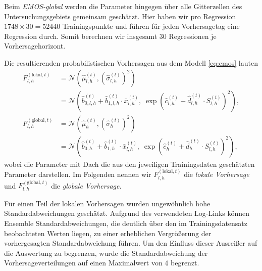 Beim \emph{EMOS-global} werden die Parameter hingegen über alle Gitterzellen des Untersuchungsgebiets gemeinsam geschätzt. Hier haben wir pro Regression $1748 \times 30 = 52440$ Trainingspunkte und führen für jeden Vorhersagetag eine Regression durch. Somit berechnen wir insgesamt $30$ Regressionen je Vorhersagehorizont.

Die resultierenden probabilistischen Vorhersagen aus dem Modell \eqref{eq:emos} lauten
\begin{equation*}
\begin{split}
F_{l,h}^{(\mathrm{lokal},t)}
&=\mathcal{N}\!\left(\hat{\mu}_{l,h}^{(t)},(\hat{\sigma}_{l,h}^{(t)})^2\right)\\
&=\mathcal{N}\!\left(\hat{b}_{0,l,h}^{(t)} + \hat{b}_{1,l,h}^{(t)} \cdot \bar{x}_{l,h}^{(t)},\;\exp\!\left(\hat{c}^{(t)}_{l,h} + \hat{d}^{(t)}_{l,h}\cdot S_{l,h}^{(t)}\right)^2\right),\\
F_{l,h}^{(\mathrm{global},t)}
&=\mathcal{N}\!\left(\hat{\mu}_{h}^{(t)},(\hat{\sigma}_{h}^{(t)})^2\right)\\
&=\mathcal{N}\!\left(\hat{b}_{0,h}^{(t)} + \hat{b}_{1,h}^{(t)} \cdot \bar{x}_{l,h}^{(t)},\;\exp\!\left(\hat{c}^{(t)}_{h} + \hat{d}^{(t)}_{h}\cdot S_{l,h}^{(t)}\right)^2\right),
\end{split}
\end{equation*}
wobei die Parameter mit Dach die aus den jeweiligen Trainingsdaten geschätzten Parameter darstellen. Im Folgenden nennen wir $F_{l,h}^{(\mathrm{lokal},t)}$ die \emph{lokale Vorhersage} und $F_{l,h}^{(\mathrm{global},t)}$ die \emph{globale Vorhersage}.

Für einen Teil der lokalen Vorhersagen wurden ungewöhnlich hohe Standardabweichungen geschätzt. Aufgrund des verwendeten Log-Links können Ensemble Standardabweichungen, die deutlich über den im Trainingsdatensatz beobachteten Werten liegen, zu einer erheblichen Vergrößerung der vorhergesagten Standardabweichung führen. Um den Einfluss dieser Ausreißer auf die Auswertung zu begrenzen, wurde die Standardabweichung der Vorhersageverteilungen auf einen Maximalwert von $4$ begrenzt.



